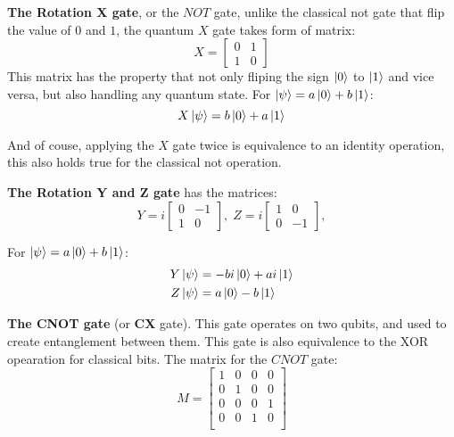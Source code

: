 \textbf{The Rotation X gate}, or the $NOT$ gate, unlike the classical not gate that flip the value of $0$ and $1$, the quantum $X$ gate takes form of matrix:
\begin{equation}
    X = \begin{bmatrix}
        0 & 1 \\
        1 & 0
    \end{bmatrix}
\end{equation}
This matrix has the property that not only fliping the sign $\left\vert{0}\right\rangle$ to $\left\vert{1}\right\rangle$ and vice versa, but also handling any quantum state.
For $\left\vert{\psi}\right\rangle = a\left\vert{0}\right\rangle + b\left\vert{1}\right\rangle$:
\begin{equation}
    X \left\vert{\psi}\right\rangle = b\left\vert{0}\right\rangle + a\left\vert{1}\right\rangle
\end{equation}

And of couse, applying the $X$ gate twice is equivalence to an identity operation, this also holds true for the classical not operation.

\textbf{The Rotation Y and Z gate} has the matrices:
\begin{equation}
    Y = i \begin{bmatrix}
        0 & -1 \\
        1 & 0
    \end{bmatrix}, \;
    Z = i \begin{bmatrix}
        1 & 0  \\
        0 & -1
    \end{bmatrix},
\end{equation}

For $\left\vert{\psi}\right\rangle = a\left\vert{0}\right\rangle + b\left\vert{1}\right\rangle$:
\begin{equation}
    \begin{split}
        Y \left\vert{\psi}\right\rangle & = -bi\left\vert{0}\right\rangle + ai\left\vert{1}\right\rangle \\
        Z \left\vert{\psi}\right\rangle & = a\left\vert{0}\right\rangle - b\left\vert{1}\right\rangle
    \end{split}
\end{equation}

\textbf{The CNOT gate} (or \textbf{CX} gate).
This gate operates on two qubits, and used to create entanglement between them.
This gate is also equivalence to the XOR opearation for classical bits.
The matrix for the $CNOT$ gate:
\begin{equation}
    M = \begin{bmatrix}
        1 & 0 & 0 & 0 \\
        0 & 1 & 0 & 0 \\
        0 & 0 & 0 & 1 \\
        0 & 0 & 1 & 0 \\
    \end{bmatrix}
\end{equation}

